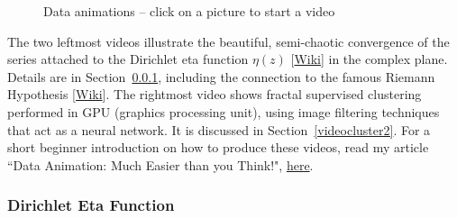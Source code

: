 \documentclass[10pt]{article}
\begin{document}
\begin{figure}[H]%
    \centering
    \qquad
   \qquad
    \caption{Data animations -- click on a picture to start a video}%
    \label{fig:example67}%
\end{figure}


The two leftmost videos illustrate the beautiful, semi-chaotic convergence of the series attached to the \textcolor{index}{Dirichlet eta function}
$\eta(z)$ [\href{https://en.wikipedia.org/wiki/Dirichlet_eta_function}{Wiki}] in the complex plane.
Details are in Section~\ref{videocluster1}, including the connection to the famous
\textcolor{index}{Riemann Hypothesis} [\href{https://en.wikipedia.org/wiki/Riemann_hypothesis}{Wiki}]. The rightmost video shows
\textcolor{index}{fractal supervised clustering} performed in GPU (graphics processing unit),  using
\textcolor{index}{image filtering techniques} that act as a \textcolor{index}{neural network}. It is discussed in Section~\ref{videocluster2}. For a short beginner introduction on how to produce these videos, read my
article ``Data Animation: Much Easier than you Think!", \href{https://www.datasciencecentral.com/data-animation-much-easier-than-you-think/}{here}.

\subsubsection{Dirichlet Eta Function}\label{videocluster1}
\end{document}

